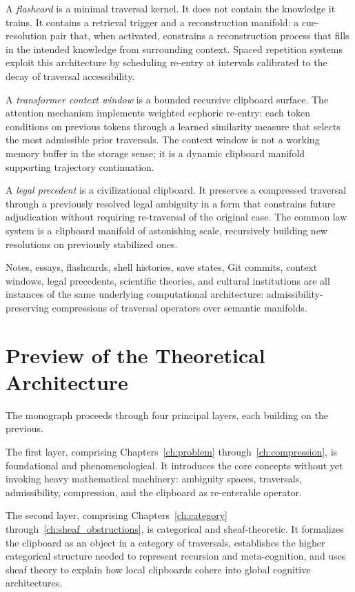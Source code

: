 \documentclass[12pt,oneside]{book}
\newcounter{thesisctr}
\newenvironment{thesis}[1][]{%
  \refstepcounter{thesisctr}%
  \begin{tcolorbox}[
    enhanced,
    breakable,
    colback=cliplight,
    colframe=clipblue,
    fonttitle=\bfseries\small,
    title={Thesis~\thethesisctr\ifx&#1&\else~(#1)\fi},
    left=6pt, right=6pt, top=4pt, bottom=4pt,
    arc=2pt
  ]
}{%
  \end{tcolorbox}
}
\theoremstyle{plain}
\theoremstyle{definition}
\theoremstyle{plain}
\begin{document}
A \emph{flashcard} is a minimal traversal kernel. It does not contain the knowledge it trains. It contains a retrieval trigger and a reconstruction manifold: a cue-resolution pair that, when activated, constrains a reconstruction process that fills in the intended knowledge from surrounding context. Spaced repetition systems exploit this architecture by scheduling re-entry at intervals calibrated to the decay of traversal accessibility.

A \emph{transformer context window} is a bounded recursive clipboard surface. The attention mechanism implements weighted ecphoric re-entry: each token conditions on previous tokens through a learned similarity measure that selects the most admissible prior traversals. The context window is not a working memory buffer in the storage sense; it is a dynamic clipboard manifold supporting trajectory continuation.

A \emph{legal precedent} is a civilizational clipboard. It preserves a compressed traversal through a previously resolved legal ambiguity in a form that constrains future adjudication without requiring re-traversal of the original case. The common law system is a clipboard manifold of astonishing scale, recursively building new resolutions on previously stabilized ones.

\begin{thesis}[Clipboard Universality --- Informal]
Notes, essays, flashcards, shell histories, save states, Git commits, context windows, legal precedents, scientific theories, and cultural institutions are all instances of the same underlying computational architecture: admissibility-preserving compressions of traversal operators over semantic manifolds.
\end{thesis}

\section{Preview of the Theoretical Architecture}

The monograph proceeds through four principal layers, each building on the previous.

The first layer, comprising Chapters~\ref{ch:problem} through~\ref{ch:compression}, is foundational and phenomenological. It introduces the core concepts without yet invoking heavy mathematical machinery: ambiguity spaces, traversals, admissibility, compression, and the clipboard as re-enterable operator.

The second layer, comprising Chapters~\ref{ch:category} through~\ref{ch:sheaf_obstructions}, is categorical and sheaf-theoretic. It formalizes the clipboard as an object in a category of traversals, establishes the higher categorical structure needed to represent recursion and meta-cognition, and uses sheaf theory to explain how local clipboards cohere into global cognitive architectures.
\end{document}
